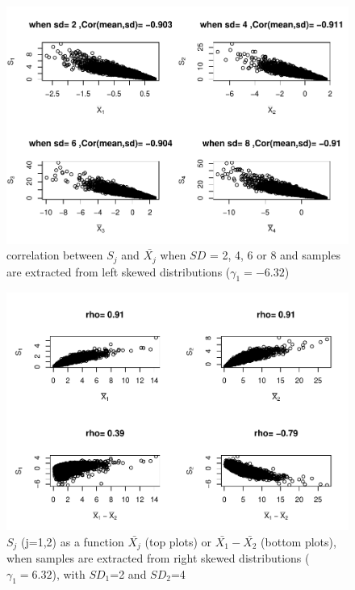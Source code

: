 \documentclass[
  english,
  man]{apa6}
\begin{document}
\begin{figure}
\centering
\includegraphics{Correlation_files/figure-latex/Hetbalcorasafctofn2-1.pdf}
\caption{\label{fig:Hetbalcorasafctofn2}correlation between \(S_j\) and \(\bar{X_j}\) when \(SD\) = 2, 4, 6 or 8 and samples are extracted from left skewed distributions (\(\gamma_1 = -6.32\))}
\end{figure}

\begin{figure}
\centering
\includegraphics{Correlation_files/figure-latex/pltSDHetbalRskew-1.pdf}
\caption{\label{fig:pltSDHetbalRskew}\(S_j\) (j=1,2) as a function \(\bar{X_j}\) (top plots) or \(\bar{X_1}-\bar{X_2}\) (bottom plots), when samples are extracted from right skewed distributions (\(\gamma_1 = 6.32\)), with \(SD_1\)=2 and \(SD_2\)=4}
\end{figure}
\end{document}
